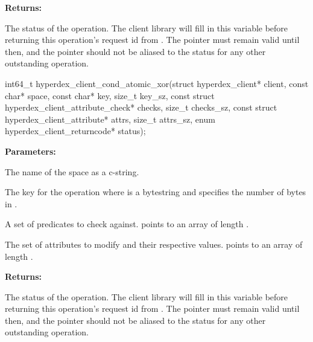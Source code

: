 \noindent\textbf{Returns:}
\begin{description}[labelindent=\widthof{{\code{status}}},leftmargin=*,noitemsep,nolistsep,align=right]
\item[\code{status}] The status of the operation.  The client library will fill in this variable before returning this operation's request id from .  The pointer must remain valid until then, and the pointer should not be aliased to the status for any other outstanding operation.
\end{description}

\funcsep
{}
\begin{ccode}
int64_t hyperdex_client_cond_atomic_xor(struct hyperdex_client* client,
                const char* space,
                const char* key, size_t key_sz,
                const struct hyperdex_client_attribute_check* checks, size_t checks_sz,
                const struct hyperdex_client_attribute* attrs, size_t attrs_sz,
                enum hyperdex_client_returncode* status);
\end{ccode}
\funcdesc 

\noindent\textbf{Parameters:}
\begin{description}[labelindent=\widthof{{\code{checks}, \code{checks\_sz}}},leftmargin=*,noitemsep,nolistsep,align=right]
\item[\code{space}] The name of the space as a c-string.
\item[\code{key}, \code{key\_sz}] The key for the operation where  is a bytestring and  specifies the number of bytes in .
\item[\code{checks}, \code{checks\_sz}] A set of predicates to check against.   points to an array of length .
\item[\code{attrs}, \code{attrs\_sz}] The set of attributes to modify and their respective values.   points to an array of length .
\end{description}

\noindent\textbf{Returns:}
\begin{description}[labelindent=\widthof{{\code{status}}},leftmargin=*,noitemsep,nolistsep,align=right]
\item[\code{status}] The status of the operation.  The client library will fill in this variable before returning this operation's request id from .  The pointer must remain valid until then, and the pointer should not be aliased to the status for any other outstanding operation.
\end{description}

